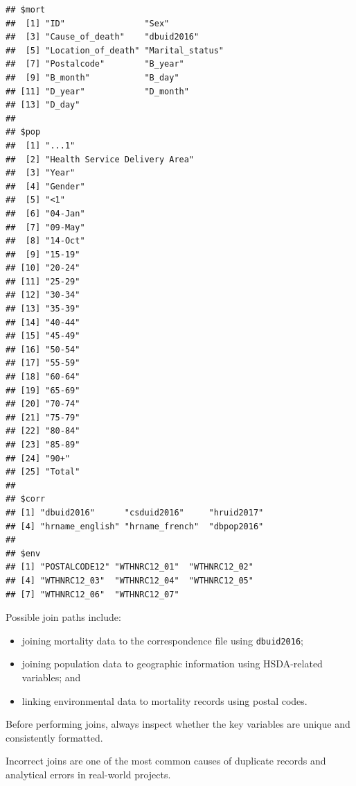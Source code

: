\documentclass[
  11pt,
  oneside]{book}
\providecommand{\tightlist}{%
  \setlength{\itemsep}{0pt}\setlength{\parskip}{0pt}}
\begin{document}
\begin{verbatim}
## $mort
##  [1] "ID"                "Sex"              
##  [3] "Cause_of_death"    "dbuid2016"        
##  [5] "Location_of_death" "Marital_status"   
##  [7] "Postalcode"        "B_year"           
##  [9] "B_month"           "B_day"            
## [11] "D_year"            "D_month"          
## [13] "D_day"            
## 
## $pop
##  [1] "...1"                        
##  [2] "Health Service Delivery Area"
##  [3] "Year"                        
##  [4] "Gender"                      
##  [5] "<1"                          
##  [6] "04-Jan"                      
##  [7] "09-May"                      
##  [8] "14-Oct"                      
##  [9] "15-19"                       
## [10] "20-24"                       
## [11] "25-29"                       
## [12] "30-34"                       
## [13] "35-39"                       
## [14] "40-44"                       
## [15] "45-49"                       
## [16] "50-54"                       
## [17] "55-59"                       
## [18] "60-64"                       
## [19] "65-69"                       
## [20] "70-74"                       
## [21] "75-79"                       
## [22] "80-84"                       
## [23] "85-89"                       
## [24] "90+"                         
## [25] "Total"                       
## 
## $corr
## [1] "dbuid2016"      "csduid2016"     "hruid2017"     
## [4] "hrname_english" "hrname_french"  "dbpop2016"     
## 
## $env
## [1] "POSTALCODE12" "WTHNRC12_01"  "WTHNRC12_02" 
## [4] "WTHNRC12_03"  "WTHNRC12_04"  "WTHNRC12_05" 
## [7] "WTHNRC12_06"  "WTHNRC12_07"
\end{verbatim}

Possible join paths include:

\begin{itemize}
\tightlist
\item
  joining mortality data to the correspondence file using \texttt{dbuid2016};
\item
  joining population data to geographic information using HSDA-related variables; and
\item
  linking environmental data to mortality records using postal codes.
\end{itemize}

Before performing joins, always inspect whether the key variables are unique and consistently formatted.

Incorrect joins are one of the most common causes of duplicate records and analytical errors in real-world projects.
\end{document}

